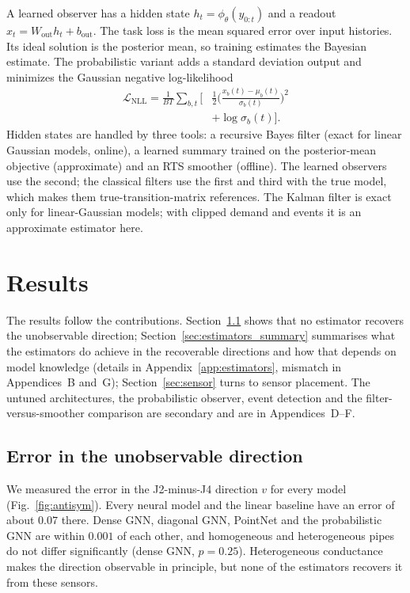 \documentclass[conference]{IEEEtran}
\begin{document}
A learned observer has a hidden state $h_t=\phi_\theta(y_{0:t})$ and a readout $\hat x_t=W_{\text{out}}h_t+b_{\text{out}}$. The task loss is the mean squared error over input histories. Its ideal solution is the posterior mean, so training estimates the Bayesian estimate. The probabilistic variant adds a standard deviation output and minimizes the Gaussian negative log-likelihood
\begin{equation}
\begin{aligned}
\mathcal{L}_{\text{NLL}}=\frac{1}{BT}\sum_{b,t}\Big[&\tfrac12\Big(\frac{x_b(t)-\mu_b(t)}{\sigma_b(t)}\Big)^2\\
&+\log\sigma_b(t)\Big].
\end{aligned}
\label{eq:nll}
\end{equation}
Hidden states are handled by three tools: a recursive Bayes filter (exact for linear Gaussian models, online), a learned summary trained on the posterior-mean objective (approximate) and an RTS smoother (offline). The learned observers use the second; the classical filters use the first and third with the true model, which makes them true-transition-matrix references. The Kalman filter is exact only for linear-Gaussian models; with clipped demand and events it is an approximate estimator here.

\section{Results}
\label{sec:results}

The results follow the contributions. Section~\ref{sec:antisym} shows that no estimator recovers the unobservable direction; Section~\ref{sec:estimators_summary} summarises what the estimators do achieve in the recoverable directions and how that depends on model knowledge (details in Appendix~\ref{app:estimators}, mismatch in Appendices~B and~G); Section~\ref{sec:sensor} turns to sensor placement. The untuned architectures, the probabilistic observer, event detection and the filter-versus-smoother comparison are secondary and are in Appendices~D--F.


\subsection{Error in the unobservable direction}
\label{sec:antisym}

We measured the error in the J2-minus-J4 direction $v$ for every model (Fig.~\ref{fig:antisym}). Every neural model and the linear baseline have an error of about $0.07$ there. Dense GNN, diagonal GNN, PointNet and the probabilistic GNN are within $0.001$ of each other, and homogeneous and heterogeneous pipes do not differ significantly (dense GNN, $p=0.25$). Heterogeneous conductance makes the direction observable in principle, but none of the estimators recovers it from these sensors.
\end{document}
